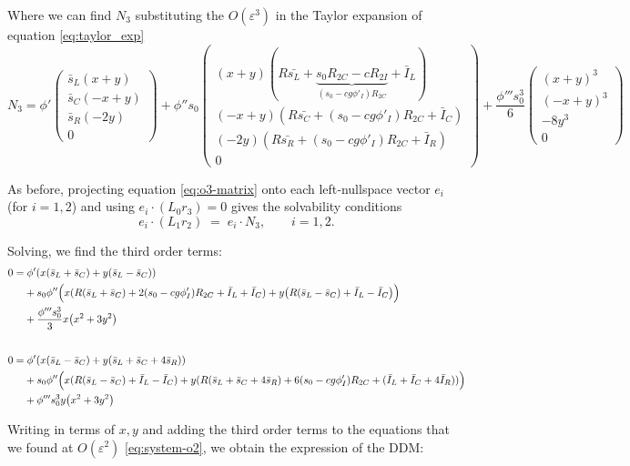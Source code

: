 \documentclass[12,twoside]{TFG-GM}
\theoremstyle{definition}
\theoremstyle{remark}
\begin{document}
Where we can find $N_3$ substituting the $O(\varepsilon^3)$ in the Taylor expansion of equation \ref{eq:taylor_exp} \, 
\[
N_3 = 
\phi'\begin{pmatrix}
\bar{s}_L(x+y)\\
\bar{s}_C(-x+y)\\ 
\bar{s}_R(-2y)\\ 
0
\end{pmatrix} +\phi''s_0\begin{pmatrix}
(x+y)(R\bar{s_L} + \underbrace{s_0R_{2C} - cR_{2I}}_{(s_0-cg\phi'_I)R_{2C}}+ \bar{I}_L)\\
(-x+y)(R\bar{s_C} +(s_0-cg\phi'_I)R_{2C}+ \bar{I}_C)\\ 
(-2y)(R\bar{s_R} +(s_0-cg\phi'_I)R_{2C} + \bar{I}_R)\\ 
0
\end{pmatrix} + \frac{\phi'''s_0^3}{6} 
\begin{pmatrix}
(x + y)^3\\  
(-x + y)^3\\  
-8y^3 \\ 
 0
\end{pmatrix}
\]

As before, projecting equation \eqref{eq:o3-matrix} onto each left‐nullspace vector \(e_i\) (for \(i=1,2\)) and using \(e_i\cdot(L_0r_3)=0\) gives the solvability conditions
\[
e_i\!\cdot\!(L_1r_2)\;=\;e_i\!\cdot\!N_3,
\qquad i=1,2.
\]

Solving, we find the third order terms:
\begin{equation}
\begin{aligned}
0 = & \; \phi'(x(\bar{s}_L+ \bar{s}_C)+y(\bar{s}_L -\bar{s}_C))\\
&+ s_0 \phi'' \Bigl( x(R(\bar{s}_L+\bar{s}_C)+2(s_0-cg\phi'_I)R_{2C}   + \bar{I}_L + \bar{I}_C)  + y\bigl(R(\bar{s}_L-\bar{s}_C) + \bar{I}_L - \bar{I}_C\bigr)\Bigr)\\
&+ \frac{\phi'''s_0^3}{3}  x\bigl(x^2+3y^2\bigr)\\[2em]
0 = &\; \phi'(x(\bar{s}_L- \bar{s}_C)+y(\bar{s}_L +\bar{s}_C+4\bar{s}_R))\\ 
& + s_0\phi'' \Bigl(x(R(\bar{s}_L-\bar{s}_C) + \bar{I}_L - \bar{I}_C) + y(R(\bar{s}_L+\bar{s}_C+ 4\bar{s}_R)+ 6(s_0-cg\phi'_I)R_{2C}  + (\bar{I}_L + \bar{I}_C + 4\bar{I}_R))\Bigr)\\
&+ \phi'''s_0^3 y\bigl(x^2+3y^2\bigr)
\notag
\end{aligned}
\end{equation}

Writing in terms of $x, y$ and adding the third order terms to the equations that we found at $O(\varepsilon^2)$  \eqref{eq:system-o2}, we obtain the expression of the DDM:
\end{document}
